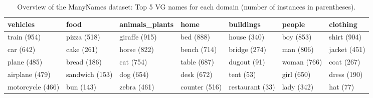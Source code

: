 \begin{table}[htp]
	\small
	\centering
	\begin{tabular}{@{~}l@{~}l@{~}l@{~}l@{~}l@{~}l@{~}l}
		\toprule
		vehicles &            food & animals\_plants &           home &        buildings &             people &      clothing \\
		\midrule
		train (954) &  pizza (518) &  giraffe (915) &  bed (888) &  house (340) &  boy (853) &  shirt (904) \\
		car (642) &  cake (261) &  horse (822) &  bench (714) &  bridge (274) &  man (806) &  jacket (451) \\
		plane (485) &  bread (186) &  cat (754) &  table (687) &  dugout (91) &  woman (766) &  coat (267) \\
		airplane (479) &  sandwich (153) &  dog (654) &  desk (672) &  tent (53) &  girl (650) &  dress (190) \\
		motorcycle (466) &  bun (143) &  zebra (461) &  counter (516) &  restaurant (33) &  lady (342) &  hat (77) \\
		\bottomrule
	\end{tabular}
	\caption{Overview of the ManyNames dataset: Top 5 VG names for each domain (number of instances in parentheses). %
		\label{tab:overview_dataset1}}
\end{table}

